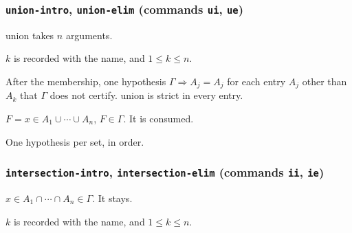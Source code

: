 \subsubsection*{\texttt{union-intro}, \texttt{union-elim}
  (commands \texttt{ui}, \texttt{ue})}

$\mathrm{union}$ takes $n$ arguments.
\label{kop:union-intro}%
\begin{VNBcond}
\item[Index] $k$ is recorded with the name, and $1 \leq k \leq n$.
\item[Definedness] After the membership, one hypothesis
  $\Gamma \Longrightarrow A_j = A_j$ for each entry $A_j$ other than
  $A_k$ that $\Gamma$ does not certify.  $\mathrm{union}$ is strict in
  every entry.
\end{VNBcond}
\label{kop:union-elim}%
\begin{VNBcond}
\item[Assumption] $F = x \in A_1 \cup \cdots \cup A_n$, $F \in \Gamma$.
  It is consumed.
\item[Arity] One hypothesis per set, in order.
\end{VNBcond}

\subsubsection*{\texttt{intersection-intro}, \texttt{intersection-elim}
  (commands \texttt{ii}, \texttt{ie})}

\label{kop:intersection-intro}%
\label{kop:intersection-elim}%
\begin{VNBcond}
\item[Assumption] $x \in A_1 \cap \cdots \cap A_n \in \Gamma$.  It stays.
\item[Index] $k$ is recorded with the name, and $1 \leq k \leq n$.
\end{VNBcond}


